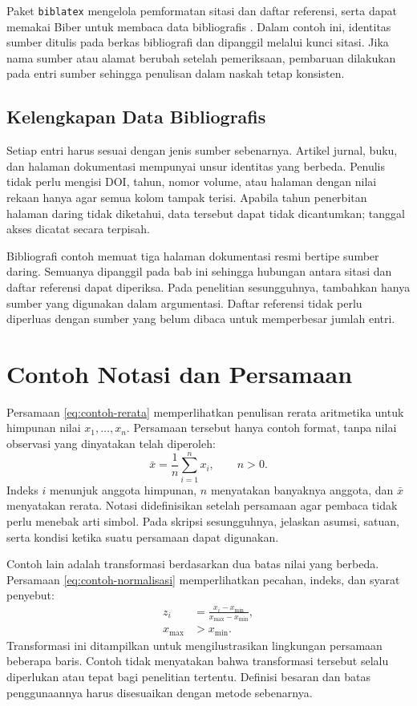 Paket \texttt{biblatex} mengelola pemformatan sitasi dan daftar referensi, serta dapat memakai Biber untuk membaca data bibliografis \parencite{ctan-biblatex}. Dalam contoh ini, identitas sumber ditulis pada berkas bibliografi dan dipanggil melalui kunci sitasi. Jika nama sumber atau alamat berubah setelah pemeriksaan, pembaruan dilakukan pada entri sumber sehingga penulisan dalam naskah tetap konsisten.

\subsection{Kelengkapan Data Bibliografis}

Setiap entri harus sesuai dengan jenis sumber sebenarnya. Artikel jurnal, buku, dan halaman dokumentasi mempunyai unsur identitas yang berbeda. Penulis tidak perlu mengisi DOI, tahun, nomor volume, atau halaman dengan nilai rekaan hanya agar semua kolom tampak terisi. Apabila tahun penerbitan halaman daring tidak diketahui, data tersebut dapat tidak dicantumkan; tanggal akses dicatat secara terpisah.

Bibliografi contoh memuat tiga halaman dokumentasi resmi bertipe sumber daring. Semuanya dipanggil pada bab ini sehingga hubungan antara sitasi dan daftar referensi dapat diperiksa. Pada penelitian sesungguhnya, tambahkan hanya sumber yang digunakan dalam argumentasi. Daftar referensi tidak perlu diperluas dengan sumber yang belum dibaca untuk memperbesar jumlah entri.

\section{Contoh Notasi dan Persamaan}
\label{sec:contoh-notasi}

Persamaan \ref{eq:contoh-rerata} memperlihatkan penulisan rerata aritmetika untuk himpunan nilai $x_1,\ldots,x_n$. Persamaan tersebut hanya contoh format, tanpa nilai observasi yang dinyatakan telah diperoleh:
\begin{equation}
  \bar{x}=\frac{1}{n}\sum_{i=1}^{n}x_i,\qquad n>0.
  \label{eq:contoh-rerata}
\end{equation}
Indeks $i$ menunjuk anggota himpunan, $n$ menyatakan banyaknya anggota, dan $\bar{x}$ menyatakan rerata. Notasi didefinisikan setelah persamaan agar pembaca tidak perlu menebak arti simbol. Pada skripsi sesungguhnya, jelaskan asumsi, satuan, serta kondisi ketika suatu persamaan dapat digunakan.

Contoh lain adalah transformasi berdasarkan dua batas nilai yang berbeda. Persamaan \ref{eq:contoh-normalisasi} memperlihatkan pecahan, indeks, dan syarat penyebut:
\begin{align}
  z_i &= \frac{x_i-x_{\min}}{x_{\max}-x_{\min}},
  \label{eq:contoh-normalisasi}\\
  x_{\max} &> x_{\min}.
  \nonumber
\end{align}
Transformasi ini ditampilkan untuk mengilustrasikan lingkungan persamaan beberapa baris. Contoh tidak menyatakan bahwa transformasi tersebut selalu diperlukan atau tepat bagi penelitian tertentu. Definisi besaran dan batas penggunaannya harus disesuaikan dengan metode sebenarnya.


